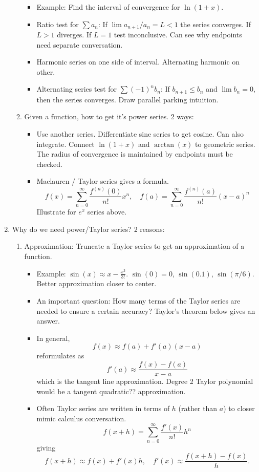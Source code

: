 \documentclass{article}
\theoremstyle{remark}
\begin{document}
\begin{enumerate}
\begin{enumerate}
\begin{itemize}
\item Example: Find the interval of convergence for $\ln(1+x)$.
\item Ratio test for $\sum a_n$: If $\lim a_{n+1}/a_n = L < 1$ the series converges. If $L>1$ diverges. If $L=1$ test inconclusive. Can see why endpoints need separate conversation.
\item Harmonic series on one side of interval. Alternating harmonic on other.
\item Alternating series test for $\sum (-1)^n b_n$: If $b_{n+1} \leq b_n$ and $\lim b_n=0$, then the series converges. Draw parallel parking intuition.  
\end{itemize}
\item Given a function, how to get it's power series. 2 ways:
\begin{itemize}
\item Use another series. Differentiate sine series to get cosine. Can also integrate. Connect $\ln(1+x)$ and $\arctan(x)$ to geometric series. The radius of convergence is maintained by endpoints must be checked.
\item Maclauren / Taylor series gives a formula.
\[
f(x) = \sum_{n=0}^{\infty} \frac{f^{(n)}(0)}{n!} x^n, \quad
f(a) = \sum_{n=0}^{\infty} \frac{f^{(n)}(a)}{n!} (x-a)^n
\]
Illustrate for $e^x$ series above.
\end{itemize}
\end{enumerate}


\item Why do we need power/Taylor series? 2 reasons:
\begin{enumerate}
\item Approximation: Truncate a Taylor series to get an approximation of a function.
\begin{itemize}
\item Example: $\sin(x) \approx x - \frac{x^3}{3!}$. $\sin(0)=0$, $\sin(0.1)$, $\sin(\pi/6)$. Better approximation closer to center.
\item An important question: How many terms of the Taylor series are needed to ensure a certain accuracy? Taylor's theorem below gives an answer.
\item In general, 
\[
f(x) \approx f(a) + f'(a) (x-a)
\]
reformulates as
\[
f'(a) \approx \frac{f(x)-f(a)}{x-a}
\]
which is the tangent line approximation. Degree 2 Taylor polynomial would be a tangent quadratic?? approximation.
\item Often Taylor series are written in terms of $h$ (rather than $a$) to closer mimic calculus conversation.
\[
f(x+h) = \sum_{n=0}^{\infty} \frac{f'(x)}{n!} h^n
\]
giving 
\[
f(x+h) \approx f(x) + f'(x)h, \quad f'(x) \approx \frac{f(x+h)-f(x)}{h}.
\]
\end{itemize}


\end{enumerate}
\end{enumerate}
\end{document}
